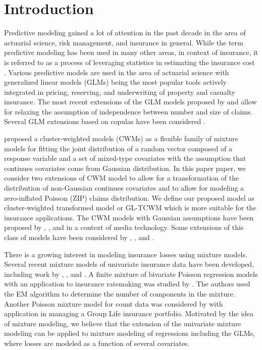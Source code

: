 \documentclass[11pt,letterpaper]{article}
\numberwithin{equation}{section}
\numberwithin{equation}{section}
\numberwithin{equation}{section}
\begin{document}
\section{Introduction}\label{sec:introduction}
Predictive modeling gained a lot of attention in the past decade in the area of actuarial science, risk management, and insurance in general. While the term predictive modeling has been used in many other areas, in context of insurance, it is referred to as a process of leveraging statistics in estimating the insurance cost \citep[see][]{Frees+Derrig+Meyer:2014}. Various predictive models are used in the area of actuarial science with generalized linear models (GLMs) being the most popular tools actively integrated in pricing, reserving, and underwriting of property and casualty insurance. The most recent extensions of the GLM models proposed by \cite{Garrido+Genest+Schulz:2016} and \cite{Shi+Feng+Ivantsova:2015} allow for relaxing the assumption of independence between number and size of claims. Several GLM extensions based on copulas have been considered \citep[e.g.,][]{Frees+Lee+Yang:2016,Kramer+Brechmann+Silvestrini+Czado:2013, Czado+Kastenmeier+Brechmann+Min:2012,Frees+Wang:2006}.


\cite{Ingrassia+Punzo+Vittadini+Minotti:2015} proposed a cluster-weighted models (CWMs) as a flexible family of mixture models for fitting the joint distribution of a random vector composed of a response variable and a set of mixed-type covariates with the assumption that continues covariates come from Gaussian distribution. In this paper paper, we consider two extensions of CWM model to allow for a transformation of the distribution of non-Gaussian continues covariates and to allow for modeling a zero-inflated Poisson (ZIP) claims distribution. We define our proposed model as cluster-weighted transformed model or GL-TCWM which is more suitable for the insurance applications.
%
The CWM models with Gaussian assumptions have been proposed by \cite{Gershenfeld:1997}, \cite{Gershenfeld:Schoner+Metois:1999}, and \cite{Gershenfeld:1999} in a context of media technology. Some extensions of this class of models have been considered by \cite{Punzo+Ingrassia:2015}, \cite{Ingrassia+Minotti+Punzo:2014}, and \cite{Ingrassia+Minotti+Vittadini:2012}.

There is a growing interest in modeling insurance losses using mixture models. Several recent mixture models of univariate insurance data have been developed, including work by \cite{Lee+Lin:2010}, \cite{Verbelen+Gong+Antonio+Badescu+Lin:2015}, and \cite{Miljkovic+Grun:2016}. A finite mixture of bivariate Poisson regression models with an application to insurance ratemaking was studied by \cite{Bermudez+Karlis:2012}. The authors used the EM algorithm to determine the number of components in the mixture. Another Poisson mixture model for count data was considered by \cite{Brown+Buckley:2015} with application in managing a Group Life insurance portfolio. Motivated by the idea of mixture modeling, we believe that the extension of the univariate mixture modeling can be applied to mixture modeling of regressions including the GLMs, where losses are modeled as a function of several covariates.
\end{document}
